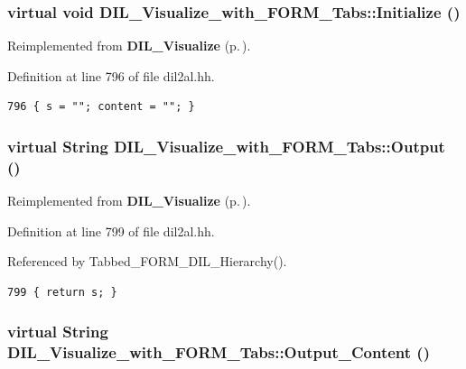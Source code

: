 \subsubsection{\setlength{\rightskip}{0pt plus 5cm}virtual void DIL\_\-Visualize\_\-with\_\-FORM\_\-Tabs::Initialize ()\hspace{0.3cm}{\tt  [inline, virtual]}}\label{classDIL__Visualize__with__FORM__Tabs_a1}




Reimplemented from {\bf DIL\_\-Visualize} {\rm (p.\,\pageref{classDIL__Visualize_a1})}.

Definition at line 796 of file dil2al.hh.



\footnotesize\begin{verbatim}796 { s = ""; content = ""; }
\end{verbatim}\normalsize 
{}
\subsubsection{\setlength{\rightskip}{0pt plus 5cm}virtual {\bf String} DIL\_\-Visualize\_\-with\_\-FORM\_\-Tabs::Output ()\hspace{0.3cm}{\tt  [inline, virtual]}}\label{classDIL__Visualize__with__FORM__Tabs_a4}




Reimplemented from {\bf DIL\_\-Visualize} {\rm (p.\,\pageref{classDIL__Visualize_a7})}.

Definition at line 799 of file dil2al.hh.

Referenced by Tabbed\_\-FORM\_\-DIL\_\-Hierarchy().



\footnotesize\begin{verbatim}799 { return s; }
\end{verbatim}\normalsize 
{}
\subsubsection{\setlength{\rightskip}{0pt plus 5cm}virtual {\bf String} DIL\_\-Visualize\_\-with\_\-FORM\_\-Tabs::Output\_\-Content ()\hspace{0.3cm}{\tt  [inline, virtual]}}\label{classDIL__Visualize__with__FORM__Tabs_a5}




